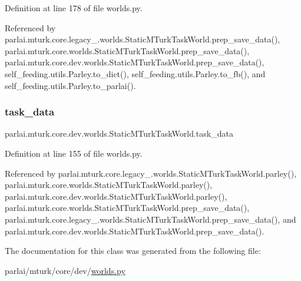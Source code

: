 Definition at line 178 of file worlds.\+py.



Referenced by parlai.\+mturk.\+core.\+legacy\+\_.\+worlds.\+Static\+M\+Turk\+Task\+World.\+prep\+\_\+save\+\_\+data(), parlai.\+mturk.\+core.\+worlds.\+Static\+M\+Turk\+Task\+World.\+prep\+\_\+save\+\_\+data(), parlai.\+mturk.\+core.\+dev.\+worlds.\+Static\+M\+Turk\+Task\+World.\+prep\+\_\+save\+\_\+data(), self\+\_\+feeding.\+utils.\+Parley.\+to\+\_\+dict(), self\+\_\+feeding.\+utils.\+Parley.\+to\+\_\+fb(), and self\+\_\+feeding.\+utils.\+Parley.\+to\+\_\+parlai().

\mbox{\label{classparlai_1_1mturk_1_1core_1_1dev_1_1worlds_1_1StaticMTurkTaskWorld_a18b4236bb2e5867aeb7a6d3c846712ac}} 
\subsubsection{\texorpdfstring{task\+\_\+data}{task\_data}}
{\footnotesize\ttfamily parlai.\+mturk.\+core.\+dev.\+worlds.\+Static\+M\+Turk\+Task\+World.\+task\+\_\+data}



Definition at line 155 of file worlds.\+py.



Referenced by parlai.\+mturk.\+core.\+legacy\+\_.\+worlds.\+Static\+M\+Turk\+Task\+World.\+parley(), parlai.\+mturk.\+core.\+worlds.\+Static\+M\+Turk\+Task\+World.\+parley(), parlai.\+mturk.\+core.\+dev.\+worlds.\+Static\+M\+Turk\+Task\+World.\+parley(), parlai.\+mturk.\+core.\+worlds.\+Static\+M\+Turk\+Task\+World.\+prep\+\_\+save\+\_\+data(), parlai.\+mturk.\+core.\+legacy\+\_.\+worlds.\+Static\+M\+Turk\+Task\+World.\+prep\+\_\+save\+\_\+data(), and parlai.\+mturk.\+core.\+dev.\+worlds.\+Static\+M\+Turk\+Task\+World.\+prep\+\_\+save\+\_\+data().



The documentation for this class was generated from the following file\+:\begin{DoxyCompactItemize}
\item 
parlai/mturk/core/dev/\hyperlink{parlai_2mturk_2core_2dev_2worlds_8py}{worlds.\+py}\end{DoxyCompactItemize}
